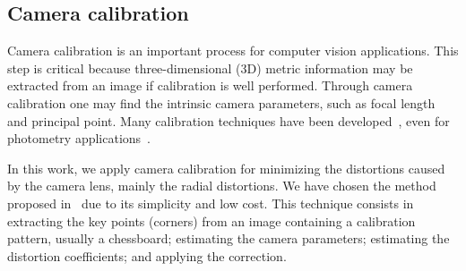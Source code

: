 %
%
%
%

\subsection{Camera calibration}\label{sec:calibration}
%
Camera  calibration is an important process for computer vision applications.
This step is critical because three-dimensional (3D) metric information may be extracted from an image if calibration is well performed.
Through camera calibration one may find the intrinsic camera parameters, such as focal length and principal point.
Many calibration techniques have been developed~\cite{Geiger2012,Zhang2010a},
even for photometry applications~\cite{Yusoff2017,Perez2012}.

In this work, we apply camera calibration for minimizing the distortions caused by the camera lens, mainly the radial distortions.
We have chosen the method proposed in~\cite{Zhang2000} due to its simplicity and low cost.
This technique consists in
extracting the key points (corners) from an image containing a calibration pattern, usually a chessboard;
estimating the camera parameters;
estimating the distortion coefficients; and
applying the correction.


%
